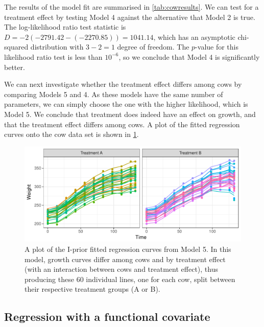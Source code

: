 \documentclass[showframe,11pt,twoside,openright]{report}\usepackage[]{graphicx}\usepackage[]{color}
\makeatletter
\def\maxwidth{ %
  \ifdim\Gin@nat@width>\linewidth
    \linewidth
  \else
    \Gin@nat@width
  \fi
}
\newenvironment{knitrout}{}{} %
\makeatother
\begin{document}
The results of the model fit are summarised in \cref{tab:cowresults}. We can test for a treatment effect by testing Model 4 against the alternative that Model 2 is true.
The log-likelihood ratio test statistic is
$D = -2(-2791.42 - (-2270.85)) = 1041.14$, which has an asymptotic chi-squared distribution with $3 - 2 = 1$ degree of freedom.
The $p$-value for this likelihood ratio test is less than $10^{-6}$, so we conclude that Model 4 is significantly better.

We can next investigate whether the treatment effect differs among cows by comparing Models 5 and 4.
As these models have the same number of parameters, we can simply choose the one with the higher likelihood, which is Model 5.
We conclude that treatment does indeed have an effect on growth, and that the treatment effect differs among cows.
A plot of the fitted regression curves onto the cow data set is shown in \cref{fig:cows.plot}.

\begin{knitrout}
\color{fgcolor}\begin{figure}[htb]

{\centering \includegraphics[width=\maxwidth]{figure/04-cows_plot-1} 

}

\caption[A plot of the I-prior fitted regression curves from Model 5]{A plot of the I-prior fitted regression curves from Model 5. In this model, growth curves differ among cows and by treatment effect (with an interaction between cows and treatment effect), thus producing these 60 individual lines, one for each cow, split between their respective treatment groups (A or B).}\label{fig:cows.plot}
\end{figure}


\end{knitrout}

\subsection{Regression with a functional covariate}
\end{document}
